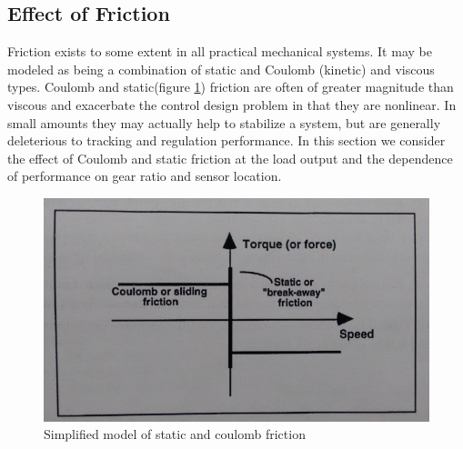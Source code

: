 \documentclass[11pt, a4paper]{article}
\begin{document}
\subsection{Effect of Friction}
Friction exists to some extent in all practical mechanical systems. It may be modeled as being a combination of static and Coulomb (kinetic) and viscous types. Coulomb and static(figure \ref{Fig12}) friction are often of greater magnitude than viscous and exacerbate the control design problem in that they are nonlinear. In small amounts they may actually help to stabilize a system, but are generally deleterious to tracking and regulation performance. In this section we consider the effect of Coulomb and static friction at the load output and the dependence of performance on gear ratio and sensor location.
\begin{figure}[H]
\centering
\includegraphics[width = \textwidth]{coulomb_friction.png}
\caption{Simplified model of static and coulomb friction}
\label{Fig12}
\end{figure}
\end{document}
